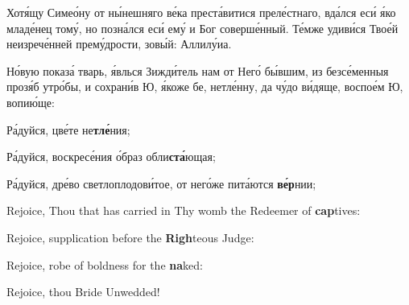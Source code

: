 \begin{russian}

  \Ierei Хотя́щу Симео́ну от ны́нешняго ве́ка преста́витися преле́стнаго, вда́лся еси́ я́ко младе́нец тому́, но позна́лся еси́ ему́ и Бог соверше́нный. Те́мже удиви́ся Твое́й неизрече́нней прему́дрости, зовы́й: Аллилу́иа.


  \Ierei Но́вую показа́ тварь, я́влься Зижди́тель нам от Него́ бы́вшим, из безсе́менныя прозя́б утро́бы, и сохрани́в Ю, я́коже бе, нетле́нну, да чу́до ви́дяще, воспое́м Ю, вопию́ще:

  Ра́дуйся, цве́те не\textbf{тле́}ния;


  Ра́дуйся, воскресе́ния о́браз обли\textbf{ста́}ющая;


  Ра́дуйся, дре́во светлоплодови́тое, от него́же пита́ются \textbf{ве́р}нии;


\end{russian}

\pagebreak



Rejoice, Thou that has carried in Thy womb the Redeemer of \textbf{cap}tives:


Rejoice, supplication before the \textbf{Righ}teous Judge:


Rejoice, robe of boldness for the \textbf{na}ked:


Rejoice, thou Bride Unwedded!



